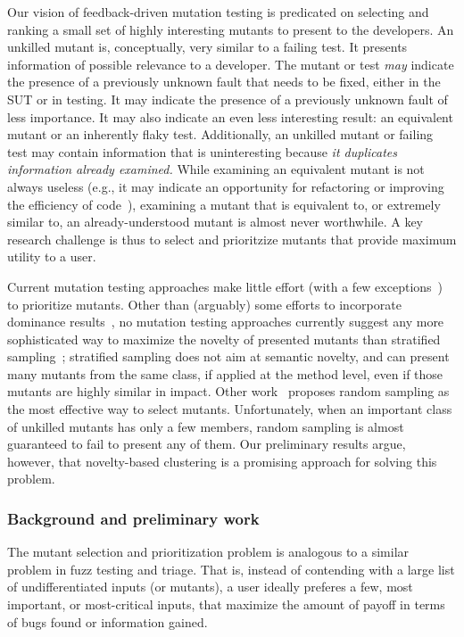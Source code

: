 Our vision of feedback-driven mutation testing is predicated on selecting and ranking a small
set of highly interesting mutants to present to the developers.  An unkilled
mutant is, conceptually, very similar to a failing test.  It presents
information of possible relevance to a developer.  The mutant or test \emph{may}
indicate the presence of a previously unknown fault that needs to be fixed,
either in the SUT or in testing.  It may indicate the presence of a previously
unknown fault of less importance.  It may also indicate an even less interesting
result: an equivalent mutant or an inherently flaky test.  Additionally, an
unkilled mutant or failing test may contain information that is uninteresting
because \emph{it duplicates information already examined.}  While examining an
equivalent mutant is not always useless (e.g., it may indicate an opportunity
for refactoring or improving the efficiency of
code~\cite{ivankovic2018industrial,groce2018verified}), examining a mutant that
is equivalent to, or extremely similar to, an already-understood mutant is
almost never worthwhile.  A key research challenge is thus to select and
prioritzize mutants that provide maximum utility to a user.

Current mutation testing approaches make little effort (with a few exceptions~\cite{MutGoogle,FaRM})
to prioritize mutants.  Other than (arguably) some efforts to
incorporate dominance results~\cite{MutQuality}, no mutation testing approaches
currently suggest any more sophisticated way to maximize the novelty of
presented mutants than stratified sampling~\cite{gopinath2017mutation};
stratified sampling does not aim at semantic novelty, and can present many
mutants from the same class, if applied at the method level, even if those
mutants are highly similar in impact.  Other work~\cite{gopinath2015howhard}
proposes random sampling as the most effective way to select mutants.
Unfortunately, when an important class of unkilled mutants has only a few
members, random sampling is almost guaranteed to fail to present any of them.
Our preliminary results argue, however, that novelty-based clustering is a
promising approach for solving this problem.

\subsubsection{Background and preliminary work}

The mutant selection and prioritization problem is analogous to a similar
problem in fuzz testing and triage.  That is, instead of contending with a large
list of undifferentiated inputs (or mutants), a user ideally preferes a few,
most important, or most-critical inputs, that maximize the amount of payoff in
terms of bugs found or information gained.

